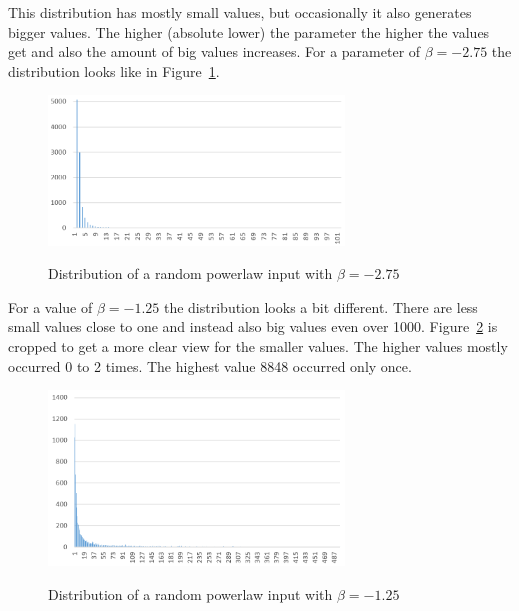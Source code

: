 This distribution has mostly small values, but occasionally it also generates bigger values.
The higher (absolute lower) the parameter the higher the values get and also the amount of big values increases.
For a parameter of $\beta=-2.75$ the distribution looks like in Figure~\ref{fig:powerDistExample1}.

\begin{figure}[h]
      \caption{Distribution of a random powerlaw input with $\beta=-2.75$}
      \centering
      \includegraphics[width=0.7\textwidth]{figures/images/numberGenerator/powerlaw_-2_75.png}\label{fig:powerDistExample1}
\end{figure}

For a value of $\beta=-1.25$ the distribution looks a bit different.
There are less small values close to one and instead also big values even over 1000.
Figure~\ref{fig:powerDistExample2} is cropped to get a more clear view for the smaller values.
The higher values mostly occurred 0 to 2 times.
The highest value 8848 occurred only once.

\begin{figure}[h]
      \caption{Distribution of a random powerlaw input with $\beta=-1.25$}
      \centering
      \includegraphics[width=0.7\textwidth]{figures/images/numberGenerator/powerlaw_-1_25.png}\label{fig:powerDistExample2}
\end{figure}